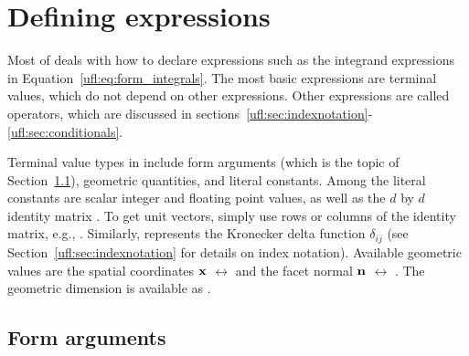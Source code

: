 \section{Defining expressions}
\label{ufl:sec:defexpr}

Most of \ufl{} deals with how to declare expressions such as the
integrand expressions in Equation~\ref{ufl:eq:form_integrals}.  The
most basic expressions are terminal values, which do not depend on
other expressions.  Other expressions are called operators, which are
discussed in sections~\ref{ufl:sec:indexnotation}-\ref{ufl:sec:conditionals}.

Terminal value types in \ufl{} include form arguments (which is the
topic of Section~\ref{ufl:sec:arguments}), geometric quantities, and
literal constants.  Among the literal constants are scalar integer and
floating point values, as well as the $d$ by $d$ identity matrix
.  To get unit vectors, simply use rows or
columns of the identity matrix, e.g., .  Similarly,
 represents the Kronecker delta function $\delta_{ij}$ (see
Section~\ref{ufl:sec:indexnotation} for details on index notation).
Available geometric values are the spatial coordinates $\mathbf{x}$
$\leftrightarrow$  and the facet normal $\mathbf{n}$
$\leftrightarrow$ .  The geometric dimension is
available as .

\subsection{Form arguments} \label{ufl:sec:arguments}

